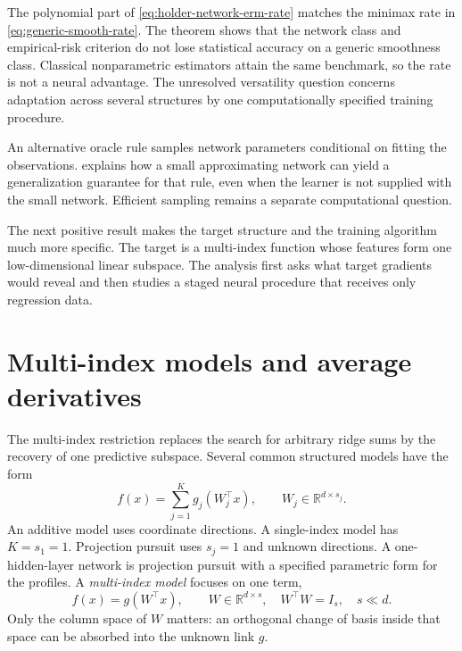 \documentclass[11pt,twoside]{article}
\newcommand{\R}{\mathbb R}
\theoremstyle{definition}
\theoremstyle{remark}
\begin{document}
The polynomial part of \cref{eq:holder-network-erm-rate} matches the minimax
rate in \cref{eq:generic-smooth-rate}. The theorem shows that the network
class and empirical-risk criterion do not lose statistical accuracy on a
generic smoothness class. Classical nonparametric estimators attain the same
benchmark, so the rate is not a neural advantage. The unresolved versatility
question concerns adaptation across several structures by one computationally
specified training procedure.

An alternative oracle rule samples network parameters conditional on fitting
the observations.  explains how a small approximating
network can yield a generalization guarantee for that rule, even when the
learner is not supplied with the small network. Efficient sampling remains a
separate computational question.

The next positive result makes the target structure and the training
algorithm much more specific. The target is a multi-index function whose
features form one low-dimensional linear subspace. The analysis first asks
what target gradients would reveal and then studies a staged neural procedure
that receives only regression data.

\section{Multi-index models and average derivatives}
\label{sec:agop}

The multi-index restriction replaces the search for arbitrary ridge sums by
the recovery of one predictive subspace. Several common structured models
have the form
\begin{equation}
 f(x)=\sum_{j=1}^K g_j(W_j^\top x),
 \qquad W_j\in\R^{d\times s_j}.
 \label{eq:structured-family}
\end{equation}
An additive model uses coordinate directions. A single-index model has
\(K=s_1=1\). Projection pursuit uses \(s_j=1\) and unknown directions.
A one-hidden-layer network is projection pursuit with a specified parametric
form for the profiles. A \emph{multi-index model} focuses on one term,
\begin{equation}
 f(x)=g(W^\top x),
 \qquad W\in\R^{d\times s},\quad W^\top W=I_s,\quad s\ll d.
 \label{eq:multi-index-model}
\end{equation}
Only the column space of \(W\) matters: an orthogonal change of basis inside
that space can be absorbed into the unknown link \(g\).
\end{document}
